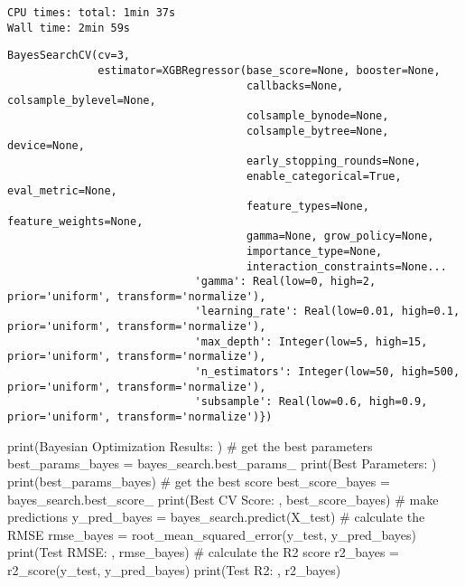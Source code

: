 \documentclass[
  letterpaper,
  DIV=11,
  numbers=noendperiod]{scrreprt}
\newenvironment{Shaded}{\begin{snugshade}}{\end{snugshade}}
\newcommand{\BuiltInTok}[1]{\textcolor[rgb]{0.00,0.23,0.31}{#1}}
\newcommand{\CommentTok}[1]{\textcolor[rgb]{0.37,0.37,0.37}{#1}}
\newcommand{\NormalTok}[1]{\textcolor[rgb]{0.00,0.23,0.31}{#1}}
\newcommand{\OperatorTok}[1]{\textcolor[rgb]{0.37,0.37,0.37}{#1}}
\newcommand{\StringTok}[1]{\textcolor[rgb]{0.13,0.47,0.30}{#1}}
\begin{document}
\begin{verbatim}
CPU times: total: 1min 37s
Wall time: 2min 59s
\end{verbatim}

\begin{verbatim}
BayesSearchCV(cv=3,
              estimator=XGBRegressor(base_score=None, booster=None,
                                     callbacks=None, colsample_bylevel=None,
                                     colsample_bynode=None,
                                     colsample_bytree=None, device=None,
                                     early_stopping_rounds=None,
                                     enable_categorical=True, eval_metric=None,
                                     feature_types=None, feature_weights=None,
                                     gamma=None, grow_policy=None,
                                     importance_type=None,
                                     interaction_constraints=None...
                             'gamma': Real(low=0, high=2, prior='uniform', transform='normalize'),
                             'learning_rate': Real(low=0.01, high=0.1, prior='uniform', transform='normalize'),
                             'max_depth': Integer(low=5, high=15, prior='uniform', transform='normalize'),
                             'n_estimators': Integer(low=50, high=500, prior='uniform', transform='normalize'),
                             'subsample': Real(low=0.6, high=0.9, prior='uniform', transform='normalize')})
\end{verbatim}

\begin{Shaded}
\begin{Highlighting}[]
\BuiltInTok{print}\NormalTok{(}\StringTok{\textquotesingle{}Bayesian Optimization Results: \textquotesingle{}}\NormalTok{)}
\CommentTok{\# get the best parameters}
\NormalTok{best\_params\_bayes }\OperatorTok{=}\NormalTok{ bayes\_search.best\_params\_}
\BuiltInTok{print}\NormalTok{(}\StringTok{\textquotesingle{}Best Parameters: \textquotesingle{}}\NormalTok{)}
\BuiltInTok{print}\NormalTok{(best\_params\_bayes)}
\CommentTok{\# get the best score}
\NormalTok{best\_score\_bayes }\OperatorTok{=}\NormalTok{ bayes\_search.best\_score\_}
\BuiltInTok{print}\NormalTok{(}\StringTok{\textquotesingle{}Best CV Score: \textquotesingle{}}\NormalTok{, best\_score\_bayes)}
\CommentTok{\# make predictions}
\NormalTok{y\_pred\_bayes }\OperatorTok{=}\NormalTok{ bayes\_search.predict(X\_test)}
\CommentTok{\# calculate the RMSE}
\NormalTok{rmse\_bayes }\OperatorTok{=}\NormalTok{ root\_mean\_squared\_error(y\_test, y\_pred\_bayes)}
\BuiltInTok{print}\NormalTok{(}\StringTok{\textquotesingle{}Test RMSE: \textquotesingle{}}\NormalTok{, rmse\_bayes)}
\CommentTok{\# calculate the R2 score}
\NormalTok{r2\_bayes }\OperatorTok{=}\NormalTok{ r2\_score(y\_test, y\_pred\_bayes)}
\BuiltInTok{print}\NormalTok{(}\StringTok{\textquotesingle{}Test R2: \textquotesingle{}}\NormalTok{, r2\_bayes)}
\end{Highlighting}
\end{Shaded}
\end{document}

